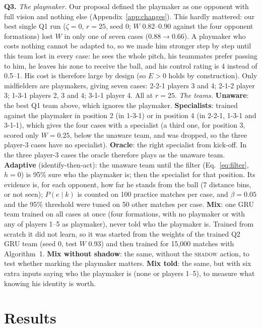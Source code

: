 \documentclass{article}
\begin{document}
\textbf{Q3.} \emph{The playmaker.} Our proposal defined the playmaker as one opponent with full vision and nothing
else (Appendix~\ref{app:changes}). This hardly mattered: our best single Q1 run ($\zeta=0$, $r=25$, seed 0; $W$
0.82--0.90 against the four opponent formations) lost $W$ in only one of seven cases ($0.88\to0.66$). A playmaker who costs nothing cannot be adapted to, so we made him stronger step by step until this
team lost in every case: he sees the whole pitch, his teammates prefer passing to him, he leaves his zone to receive
the ball, and his control rating is 4 instead of 0.5--1. His cost is therefore large by design (so $E>0$ holds by construction). Only midfielders are
playmakers, giving seven cases: 2-2-1 players 3 and 4; 2-1-2 player 3; 1-3-1 players 2, 3 and 4; 3-1-1 player 4.
All at $r=25$.
\emph{The teams.} \textbf{Unaware}: the best Q1 team above, which ignores the playmaker. \textbf{Specialists}:
trained against the playmaker in position 2 (in 1-3-1) or in position 4 (in 2-2-1, 1-3-1 and 3-1-1), which gives the
four cases with a specialist (a third one, for position 3, scored only $W=0.25$, below the
unaware team, and was dropped, so the three player-3 cases have no specialist). \textbf{Oracle}: the right specialist from kick-off. In the three player-3 cases the oracle therefore plays as the unaware team. \textbf{Adaptive}
(identify-then-act): the unaware team until the filter (Eq.~\ref{eq:filter}, $h=0$) is 95\% sure who the playmaker is;
then the specialist for that position. Its evidence is, for each opponent, how far he stands from the ball (7 distance
bins, or not seen); $P(e\mid k)$ is counted on 100 practice matches per case, and $\beta=0.05$ and the 95\% threshold
were tuned on 50 other matches per case. \textbf{Mix}: one GRU team trained on all cases at once (four
formations, with no playmaker or with any of players 1--5 as playmaker), never told who the playmaker is. Trained from
scratch it did not learn, so it was started from the weights of the trained Q2 GRU team (seed 0, test $W$ 0.93) and
then trained for 15{,}000 matches with Algorithm~1. \textbf{Mix without
shadow}: the same, without the \textsc{shadow} action, to test whether marking the playmaker matters. \textbf{Mix
told}: the same, but with six extra inputs saying who the playmaker is (none or players 1--5), to measure what knowing his identity is worth.

\section{Results}
\label{sec:results}
\end{document}
